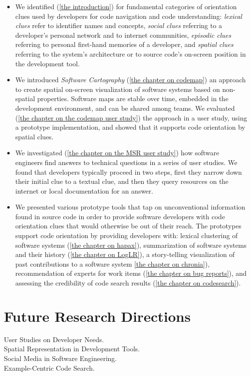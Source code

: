 \begin{itemize}
\item We identified (\autoref{the introduction}) for fundamental categories of orientation clues used by developers for code navigation and code understanding: \emph{lexical clues} refer to identifier names and concepts, \emph{social clues} referring to a developer's personal network and to internet communities, \emph{episodic clues} referring to personal first-hand memories of a developer, and \emph{spatial clues} referring to the system's architecture or to source code's on-screen position in the development tool.
\item We introduced \emph{Software Cartography} (\autoref{the chapter on codemap}) an approach to create spatial on-screen visualization of software systems based on non-spatial properties. Software maps are stable over time, embedded in the development environment, and can be shared among teams. We evaluated (\autoref{the chapter on the codemap user study}) the approach in a user study, using a prototype implementation, and showed that it supports code orientation by spatial clues.
\item We investigated (\autoref{the chapter on the MSR user study}) how software engineers find answers to technical questions in a series of user studies. We found that developers typically proceed in two steps, first they narrow down their initial clue to a textual clue, and then they query resources on the internet or local documentation for an answer.
\item We presented various prototype tools that tap on unconventional information found in source code in order to provide software developers with code orientation clues that would otherwise be out of their reach. The prototypes support code orientation by providing developers with: lexical clustering of software systems (\autoref{the chapter on hapax}), summarization of software systems and their history (\autoref{the chapter on LogLR}), a story-telling visualization of past contributions to a software system \autoref{the chapter on chronia}), recommendation of experts for work items (\autoref{the chapter on bug reports}), and assessing the credibility of code search results (\autoref{the chapter on codesearch}).
\end{itemize} 

\section{Future Research Directions}

\begin{description}
\item[User Studies on Developer Needs.]
\item[Spatial Representation in Development Tools.]
\item[Social Media in Software Engineering.]
\item[Example-Centric Code Search.]
\item[]
\end{description}

